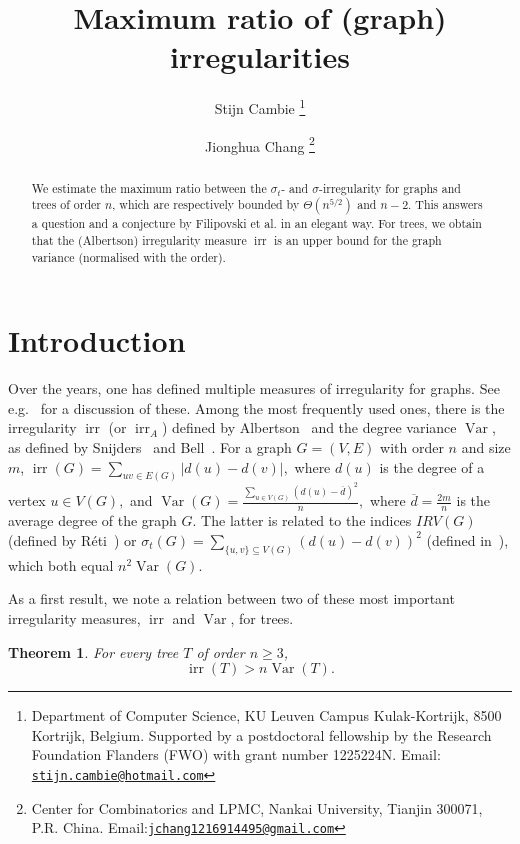 \documentclass[a4paper,11pt]{article}
\author{Stijn Cambie
 \thanks{Department of Computer Science, KU Leuven Campus Kulak-Kortrijk, 8500 Kortrijk, Belgium. Supported by a postdoctoral fellowship by the Research Foundation Flanders (FWO) with grant number 1225224N. Email: \protect\href{mailto:stijn.cambie@hotmail.com}{\protect\nolinkurl{stijn.cambie@hotmail.com}}} \and Jionghua Chang  \thanks{Center for Combinatorics and LPMC, Nankai University, Tianjin 300071, P.R. China. Email:\protect\href{jchang1216914495@gmail.com}{\protect\nolinkurl{jchang1216914495@gmail.com}}}}
\title{Maximum ratio of (graph) irregularities}
\newcommand*{\abs}[1]{\lvert #1\rvert}
\newtheorem{thm}[defi]{Theorem}
\DeclareMathOperator{\irr}{irr}
\DeclareMathOperator{\Var}{Var}
\begin{document}
\parindent=0cm
\maketitle

\begin{abstract}
    We estimate the maximum ratio between the $\sigma_t$- and $\sigma$-irregularity for graphs and trees of order $n$, which are respectively bounded by $\Theta(n^{5/2})$ and $n-2$. This answers a question and a conjecture by Filipovski et al. in an elegant way.
    For trees, we obtain that the (Albertson) irregularity measure $\irr$ is an upper bound for the graph variance (normalised with the order).
\end{abstract}


\section{Introduction}
Over the years, one has defined multiple measures of irregularity for graphs. See e.g.~\cite{ADG19} for a discussion of these.
Among the most frequently used ones, there is the irregularity $\irr$ (or $\irr_A$) defined by Albertson~\cite{Albertson97} and the degree variance $\Var$, as defined by Snijders~\cite{snijders81} and Bell~\cite{Bell92}.
For a graph $G=(V, E)$ with order $n$ and size $m$, $\irr(G)=\sum_{uv\in E(G)}\abs{d(u)-d(v)},$ where $d(u)$ is the degree of a vertex $u \in V(G),$ and
$\Var(G)= \frac{\sum_{u\in V(G)}(d(u)-\overline{d})^{2}}{n},$ where $\overline d=\frac{2m}{n}$ is the average degree of the graph $G$.
The latter is related to the indices $IRV(G)$ (defined by R\'{e}ti~\cite{Reti19}) or $\sigma_{t}(G)=\sum_{\{u,v\}\subseteq V(G)}(d(u)-d(v))^2$ (defined in~\cite{DS23}), which both equal $n^2\Var(G).$

As a first result, we note a relation between two of these most important irregularity measures, $\irr$ and $\Var$, for trees.

\begin{thm}\label{thm:1}
    For every tree $T$ of order $n \ge 3$,
    $$\irr(T) > n \Var(T).$$
\end{thm}
\end{document}
